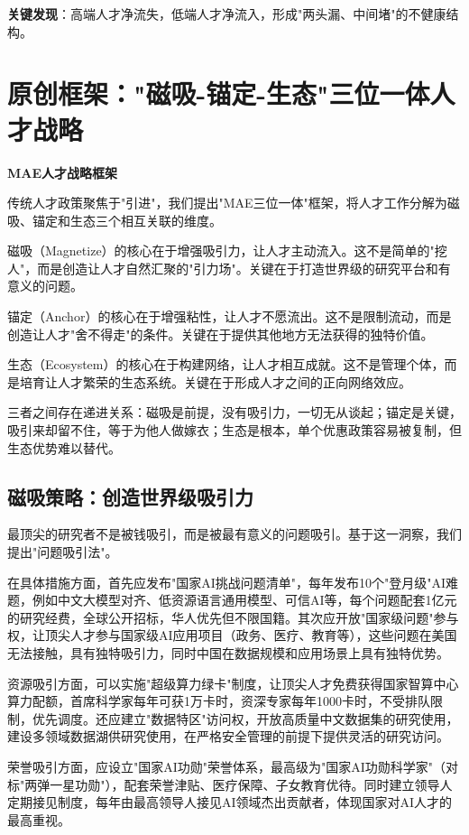\textbf{关键发现}：高端人才净流失，低端人才净流入，形成"两头漏、中间堵"的不健康结构。

\section{原创框架："磁吸-锚定-生态"三位一体人才战略}

\textbf{MAE人才战略框架}

传统人才政策聚焦于"引进"，我们提出"MAE三位一体"框架，将人才工作分解为磁吸、锚定和生态三个相互关联的维度。

磁吸（Magnetize）的核心在于增强吸引力，让人才主动流入。这不是简单的"挖人"，而是创造让人才自然汇聚的"引力场"。关键在于打造世界级的研究平台和有意义的问题。

锚定（Anchor）的核心在于增强粘性，让人才不愿流出。这不是限制流动，而是创造让人才"舍不得走"的条件。关键在于提供其他地方无法获得的独特价值。

生态（Ecosystem）的核心在于构建网络，让人才相互成就。这不是管理个体，而是培育让人才繁荣的生态系统。关键在于形成人才之间的正向网络效应。

三者之间存在递进关系：磁吸是前提，没有吸引力，一切无从谈起；锚定是关键，吸引来却留不住，等于为他人做嫁衣；生态是根本，单个优惠政策容易被复制，但生态优势难以替代。

\subsection{磁吸策略：创造世界级吸引力}

最顶尖的研究者不是被钱吸引，而是被最有意义的问题吸引。基于这一洞察，我们提出"问题吸引法"。

在具体措施方面，首先应发布"国家AI挑战问题清单"，每年发布10个"登月级"AI难题，例如中文大模型对齐、低资源语言通用模型、可信AI等，每个问题配套1亿元的研究经费，全球公开招标，华人优先但不限国籍。其次应开放"国家级问题"参与权，让顶尖人才参与国家级AI应用项目（政务、医疗、教育等），这些问题在美国无法接触，具有独特吸引力，同时中国在数据规模和应用场景上具有独特优势。

资源吸引方面，可以实施"超级算力绿卡"制度，让顶尖人才免费获得国家智算中心算力配额，首席科学家每年可获1万卡时，资深专家每年1000卡时，不受排队限制，优先调度。还应建立"数据特区"访问权，开放高质量中文数据集的研究使用，建设多领域数据湖供研究使用，在严格安全管理的前提下提供灵活的研究访问。

荣誉吸引方面，应设立"国家AI功勋"荣誉体系，最高级为"国家AI功勋科学家"（对标"两弹一星功勋"），配套荣誉津贴、医疗保障、子女教育优待。同时建立领导人定期接见制度，每年由最高领导人接见AI领域杰出贡献者，体现国家对AI人才的最高重视。

